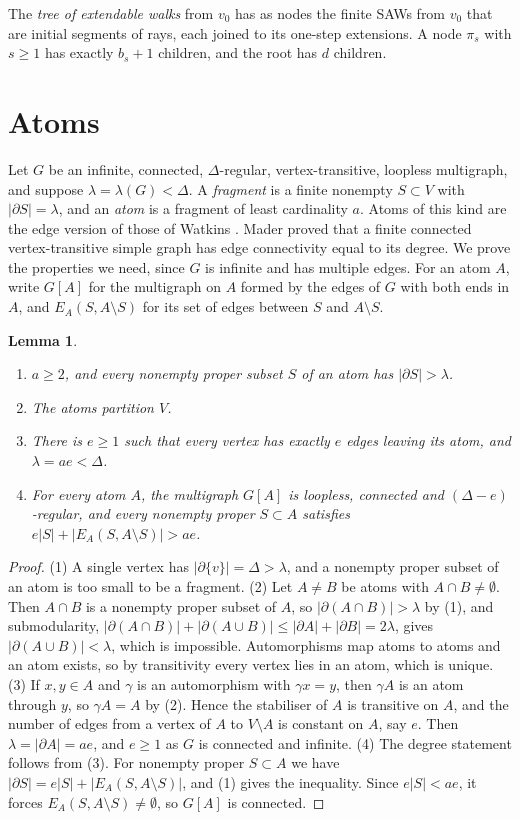 \documentclass[11pt]{amsart}
\newtheorem{lemma}[theorem]{Lemma}
\theoremstyle{remark}
\newcommand{\pd}{\partial}
\begin{document}
The \emph{tree of extendable walks} from $v_0$ has as nodes the finite SAWs from $v_0$ that are initial segments of
rays, each joined to its one-step extensions. A node $\pi_s$ with $s\ge1$ has exactly $b_s+1$ children, and the root
has $d$ children.

\section{Atoms}\label{sec:atoms}

Let $G$ be an infinite, connected, $\Delta$-regular, vertex-transitive, loopless multigraph, and suppose
$\lambda=\lambda(G)<\Delta$. A \emph{fragment} is a finite nonempty $S\subset V$ with $|\pd S|=\lambda$, and an
\emph{atom} is a fragment of least cardinality $a$. Atoms of this kind are the edge version of those of Watkins \cite{Wat70}. Mader \cite{Mad71} proved
that a finite connected vertex-transitive simple graph has edge connectivity equal to its degree. We prove the properties
we need, since $G$ is infinite and has multiple edges.
For an atom $A$, write $G[A]$ for the multigraph on $A$ formed by the edges of $G$ with both ends in $A$, and
$E_A(S,A\setminus S)$ for its set of edges between $S$ and $A\setminus S$.

\begin{lemma}\label{lem:atoms}
\begin{enumerate}
\item $a\ge2$, and every nonempty proper subset $S$ of an atom has $|\pd S|>\lambda$.
\item The atoms partition $V$.
\item There is $e\ge1$ such that every vertex has exactly $e$ edges leaving its atom, and $\lambda=ae<\Delta$.
\item For every atom $A$, the multigraph $G[A]$ is loopless, connected and $(\Delta-e)$-regular, and every nonempty
proper $S\subset A$ satisfies $e|S|+|E_A(S,A\setminus S)|>ae$.
\end{enumerate}
\end{lemma}

\begin{proof}
(1) A single vertex has $|\pd\{v\}|=\Delta>\lambda$, and a nonempty proper subset of an atom is too small to be a
fragment. (2) Let $A\ne B$ be atoms with $A\cap B\ne\emptyset$. Then $A\cap B$ is a nonempty proper subset of $A$, so
$|\pd(A\cap B)|>\lambda$ by (1), and submodularity, $|\pd(A\cap B)|+|\pd(A\cup B)|\le|\pd A|+|\pd B|=2\lambda$, gives
$|\pd(A\cup B)|<\lambda$, which is impossible. Automorphisms map atoms to atoms and an atom exists, so by
transitivity every vertex lies in an atom, which is unique. (3) If $x,y\in A$ and $\gamma$ is an automorphism with
$\gamma x=y$, then $\gamma A$ is an atom through $y$, so $\gamma A=A$ by (2). Hence the stabiliser of $A$ is
transitive on $A$, and the number of edges from a vertex of $A$ to $V\setminus A$ is constant on $A$, say $e$. Then
$\lambda=|\pd A|=ae$, and $e\ge1$ as $G$ is connected and infinite. (4) The degree statement follows from (3). For
nonempty proper $S\subset A$ we have $|\pd S|=e|S|+|E_A(S,A\setminus S)|$, and (1) gives the inequality. Since
$e|S|<ae$, it forces $E_A(S,A\setminus S)\ne\emptyset$, so $G[A]$ is connected.
\end{proof}
\end{document}
